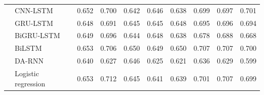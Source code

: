 \begin{footnotesize}
\begin{longtable}{@{} l l cccccccc @{}}
 & CNN-LSTM & 0.652 & 0.700 & 0.642 & 0.646 & 0.638 & 0.699 & 0.697 & 0.701 \\
 & GRU-LSTM & 0.648 & 0.691 & 0.645 & 0.645 & 0.648 & 0.695 & 0.696 & 0.694 \\
 & BiGRU-LSTM & 0.649 & 0.696 & 0.644 & 0.648 & 0.638 & 0.678 & 0.688 & 0.668 \\
 & BiLSTM & 0.653 & 0.706 & 0.650 & 0.649 & 0.650 & 0.707 & 0.707 & 0.700 \\
 & DA-RNN & 0.640 & 0.627 & 0.646 & 0.625 & 0.621 & 0.636 & 0.629 & 0.599 \\
 & Logistic regression & 0.653 & 0.712 & 0.645 & 0.641 & 0.639 & 0.701 & 0.707 & 0.699 \\
\end{longtable}
\end{footnotesize}